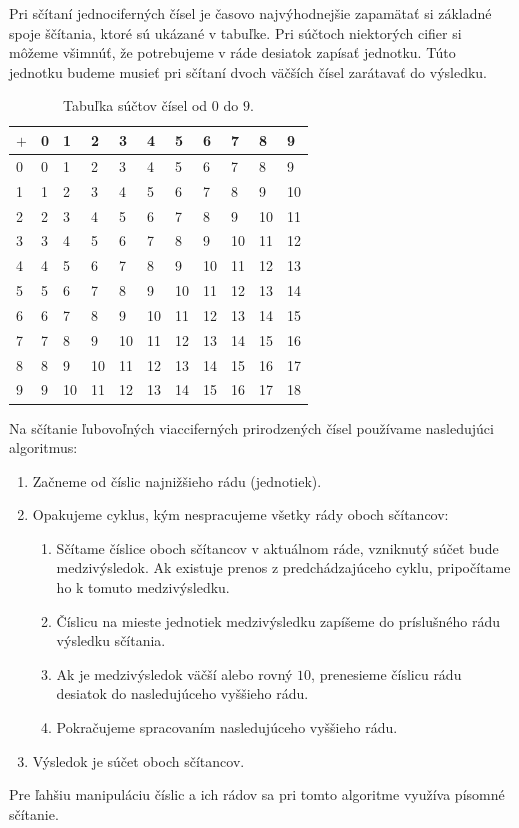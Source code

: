 \documentclass{report}
\begin{document}
Pri sčítaní jednociferných čísel je časovo najvýhodnejšie zapamätať si základné spoje ščítania, ktoré sú ukázané v tabuľke. Pri súčtoch niektorých cifier si môžeme všimnúť, že potrebujeme v ráde desiatok zapísať jednotku. Túto jednotku budeme musieť pri sčítaní dvoch väčších čísel zarátavať do výsledku.
\begin{table}[H]
  \centering
  \renewcommand{\arraystretch}{1.3}
  \begin{tabular}{C|CCCCCCCCCC}
    \(+\) & 0 & 1 & 2 & 3 & 4 & 5 & 6 & 7 & 8 & 9 \\
     & 0 & 1 & 2 & 3 & 4 & 5 & 6 & 7 & 8 & 9 \\
    1 & 1 & 2 & 3 & 4 & 5 & 6 & 7 & 8 & 9 & 10 \\
    2 & 2 & 3 & 4 & 5 & 6 & 7 & 8 & 9 & 10 & 11 \\
    3 & 3 & 4 & 5 & 6 & 7 & 8 & 9 & 10 & 11 & 12 \\
    4 & 4 & 5 & 6 & 7 & 8 & 9 & 10 & 11 & 12 & 13 \\
    5 & 5 & 6 & 7 & 8 & 9 & 10 & 11 & 12 & 13 & 14 \\
    6 & 6 & 7 & 8 & 9 & 10 & 11 & 12 & 13 & 14 & 15 \\
    7 & 7 & 8 & 9 & 10 & 11 & 12 & 13 & 14 & 15 & 16 \\
    8 & 8 & 9 & 10 & 11 & 12 & 13 & 14 & 15 & 16 & 17 \\
    9 & 9 & 10 & 11 & 12 & 13 & 14 & 15 & 16 & 17 & 18 \\
  \end{tabular}
  \caption{Tabuľka súčtov čísel od \(0\) do \(9\).}
\end{table}

Na sčítanie ľubovoľných viacciferných prirodzených čísel používame nasledujúci algoritmus:
\begin{enumerate}[label=\arabic*)]
  \item Začneme od číslic najnižšieho rádu (jednotiek).
  \item Opakujeme cyklus, kým nespracujeme všetky rády oboch sčítancov:
  \begin{enumerate}
    \item Sčítame číslice oboch sčítancov v aktuálnom ráde, vzniknutý súčet bude medzivýsledok. Ak existuje prenos z predchádzajúceho cyklu, pripočítame ho k tomuto medzivýsledku.
    \item Číslicu na mieste jednotiek medzivýsledku zapíšeme do príslušného rádu výsledku sčítania.
    \item Ak je medzivýsledok väčší alebo rovný \(10\), prenesieme číslicu rádu desiatok do nasledujúceho vyššieho rádu.
    \item Pokračujeme spracovaním nasledujúceho vyššieho rádu.
  \end{enumerate}
  \item Výsledok je súčet oboch sčítancov.
\end{enumerate}
Pre ľahšiu manipuláciu číslic a ich rádov sa pri tomto algoritme využíva písomné sčítanie.
\end{document}
